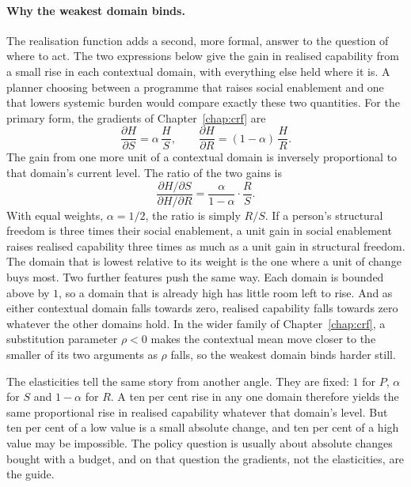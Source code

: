 \paragraph{Why the weakest domain binds.} The realisation function adds a
second, more formal, answer to the question of where to act. The two
expressions below give the gain in realised capability from a small rise in
each contextual domain, with everything else held where it is. A planner
choosing between a programme that raises social enablement and one that
lowers systemic burden would compare exactly these two quantities. For the
primary form, the gradients of Chapter~\ref{chap:crf} are
\[
\frac{\partial H}{\partial S}=\alpha\,\frac{H}{S},
\qquad
\frac{\partial H}{\partial R}=(1-\alpha)\,\frac{H}{R}.
\]
The gain from one more unit of a contextual domain is inversely proportional
to that domain's current level. The ratio of the two gains is
\[
\frac{\partial H/\partial S}{\partial H/\partial R}
=\frac{\alpha}{1-\alpha}\cdot\frac{R}{S}.
\]
With equal weights, $\alpha=1/2$, the ratio is simply $R/S$. If a person's
structural freedom is three times their social enablement, a unit gain in
social enablement raises realised capability three times as much as a unit
gain in structural freedom. The domain that is lowest relative to its weight
is the one where a unit of change buys most. Two further features push the
same way. Each domain is bounded above by $1$, so a domain that is already
high has little room left to rise. And as either contextual domain falls
towards zero, realised capability falls towards zero whatever the other
domains hold. In the wider family of Chapter~\ref{chap:crf}, a substitution
parameter $\rho<0$ makes the contextual mean move closer to the smaller of its
two arguments as $\rho$ falls, so the weakest domain binds harder still.

The elasticities tell the same story from another angle. They are fixed:
$1$ for $P$, $\alpha$ for $S$ and $1-\alpha$ for $R$. A ten per cent rise in
any one domain therefore yields the same proportional rise in realised
capability whatever that domain's level. But ten per cent of a low value is a
small absolute change, and ten per cent of a high value may be impossible.
The policy question is usually about absolute changes bought with a budget,
and on that question the gradients, not the elasticities, are the guide.

